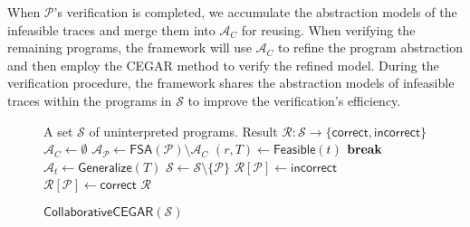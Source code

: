 When $\mathcal{P}$'s verification is completed, we accumulate the abstraction models of the infeasible traces
and merge them into $\mathcal{A}_C$ for reusing. When verifying the remaining programs, the framework will use $\mathcal{A}_C$
to refine the program abstraction and then employ the CEGAR method to verify the refined model.
During the verification procedure, the framework shares the abstraction models of infeasible traces within the programs
in $\mathcal{S}$ to improve the verification's efficiency.



\begin{wrapfigure}{r}{0.55\textwidth}
	\begin{minipage}{0.55\textwidth}
	\vspace{-1.5cm}
\begin{algorithm}[H]
\caption{$\mathsf{CollaborativeCEGAR}(\mathcal{S})$}
\label{alg:frame}
	\begin{algorithmic}[1] %
		\REQUIRE A set $\mathcal{S}$ of uninterpreted programs.
		\ENSURE Result $\mathcal{R}: \mathcal{S} \rightarrow \{\mathsf{correct}, \mathsf{incorrect}\}$
		\STATE $\mathcal{A}_C \leftarrow \emptyset$
			\STATE $\mathcal{A}_{\mathcal{P}} \leftarrow \mathsf{FSA}(\mathcal{P}) \setminus \mathcal{A}_C$
				\STATE $(r, T) \gets \mathsf{Feasible}(t)$
					\STATE  ${\bf break}$
                \ELSE
					\STATE $\mathcal{A}_t \leftarrow \mathsf{Generalize}(T) $
				\ENDIF
                \ENDWHILE
                \STATE $ \mathcal{S} \leftarrow \mathcal{S} \setminus \{\mathcal{P}\}$
                	\STATE  $\mathcal{R}[\mathcal{P}] \leftarrow \mathsf{incorrect}$
				\ELSE
					\STATE $\mathcal{R}[\mathcal{P}] \leftarrow \mathsf{correct}$
				\ENDIF
        \ENDWHILE
        \RETURN $\mathcal{R}$
	\end{algorithmic}
\end{algorithm}
\vspace{-1.7cm}
\end{minipage}
\end{wrapfigure}

